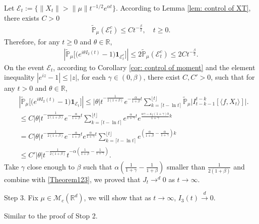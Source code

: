 \documentclass[12pt,oneside,english]{amsart}
\theoremstyle{plain}
\theoremstyle{definition}
\numberwithin{equation}{section}
\begin{document}
Let $\mathcal{E}_t:=\{\|X_t\|>\|\mu\|t^{-1/2}e^{\alpha t}\}$. According to Lemma \ref{lem: control of XT}, there exists $C>0$
\begin{align}
    \mathbb{\tilde{P}}_{\mu}(\mathcal{E}^c_t)\leq C t^{-\frac{\beta}{2}}, \quad t\geq0.
\end{align}
    Therefore, for any $t\geq 0$ and $\theta\in \mathbb{R}$,
    \begin{align}\label{Theorem123}
        \left|\mathbb{\tilde{P}}_{\mu}\big [\big(e^{i\theta I_2(t)}-1\big)\mathbf{1}_{\mathcal{E}^c_t}\big]\right|\leq 2\mathbb{\tilde{P}}_{\mu}(\mathcal{E}^c_t)\leq 2Ct^{-\frac{\beta}{2}}.
    \end{align}
On the event $\mathcal{E}_t$, according to Corollary \ref{cor: control of moment} and the element inequality $|e^{i z}-1|\leq |z|$, for each $\gamma\in (0,\beta)$, there exist $C,C'>0$, such that for any $t>0$ and $\theta \in \mathbb{R}$, 
\begin{align*}
    &\left|\mathbb{\tilde{P}}_{\mu}\big[\big(e^{i\theta I_2(t)}-1\big)\mathbf{1}_{\mathcal{E}_t}\big]\right|
    \leq|\theta| t^{-\frac{1}{2(1+\beta)}}e^{-\frac{\alpha}{1+\beta}t}\sum_{k=\lceil t-\ln t \rceil}^{\lfloor t \rfloor}\mathbb{\tilde{P}}_{\mu}\big| I_{t-k-1}^{t-k}[\langle f,X_t\rangle]\big|.\\
    &\leq C |\theta| t^{-\frac{1}{2(1+\beta)}}e^{-\frac{\alpha}{1+\beta}t}\sum_{k=\lceil t-\ln t \rceil}^{\lfloor t \rfloor}e^{\frac{\alpha}{1+\gamma}t}e^{\frac{\alpha\gamma-\kappa_f(1+\gamma)b}{1+\gamma}k}\\
    &= C |\theta| t^{-\frac{1}{2(1+\beta)}}e^{-\frac{\alpha}{1+\beta}t}e^{\frac{\alpha}{1+\gamma}t}\sum_{k=\lceil t-\ln t \rceil}^{\lfloor t \rfloor}e^{(\frac{\alpha}{1+\beta}-\frac{\alpha}{1+\gamma})k}\\
    &\leq C'|\theta|t^{-\frac{1}{2(1+\beta)}}t^{-\alpha(\frac{1}{1+\beta}-\frac{1}{1+\gamma})}.
\end{align*}
 Take $\gamma$ close enough to $\beta$ such that $\alpha(\frac{1}{1+\gamma}-\frac{1}{1+\beta})$ smaller than $\frac{1}{2(1+\beta)}$ and combine with \eqref{Theorem123}, we proved that $J_t \rightarrow^d 0$ as $t\rightarrow \infty$.
 
Step 3. Fix $\mu \in \mathcal{M}_c(\mathbb{R}^d)$, we will show that as $t\rightarrow \infty$, $I_3(t) \xrightarrow{d} 0$.

Similar to the proof of Stop 2.
\end{document}
